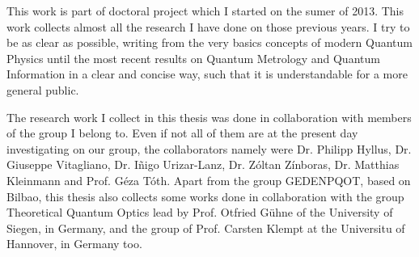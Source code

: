 This work is part of doctoral project which I started on the sumer of 2013.
This work collects almost all the research I have done on those previous years.
I try to be as clear as possible, writing from the very basics concepts of modern Quantum Physics until the most recent results on Quantum Metrology and Quantum Information in a clear and concise way, such that it is understandable for a more general public.

The research work I collect in this thesis was done in collaboration with members of the group I belong to.
Even if not all of them are at the present day investigating on our group, the collaborators namely were Dr. Philipp Hyllus, Dr. Giuseppe Vitagliano, Dr. I\~nigo Urizar-Lanz, Dr. Z\'oltan Z\'inboras, Dr. Matthias Kleinmann and Prof. G\'eza T\'oth.
Apart from the group GEDENPQOT, based on Bilbao, this thesis also collects some works done in collaboration with the group Theoretical Quantum Optics lead by Prof. Otfried G\"uhne of the University of Siegen, in Germany, and the group of Prof. Carsten Klempt at the Universitu of Hannover, in Germany too.
